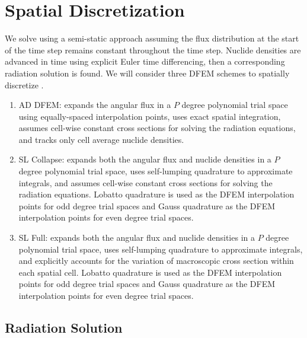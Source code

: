 \section{Spatial Discretization}

We solve  using a semi-static approach \cite{bell_glasstone} assuming the flux distribution at the start of the time step remains constant throughout the time step.
Nuclide densities are advanced in time using explicit Euler time differencing, then a corresponding radiation solution is found.  
We will consider three DFEM schemes to spatially discretize .
\begin{enumerate}
\item AD DFEM: expands the angular flux in a $P$ degree polynomial trial space using equally-spaced interpolation points, uses exact spatial integration, assumes  cell-wise constant cross sections for solving the radiation equations, and tracks only cell average nuclide densities.
\item SL Collapse: expands both the angular flux and nuclide densities in a $P$ degree polynomial trial space, uses self-lumping quadrature to approximate integrals, and assumes cell-wise constant cross sections for solving the radiation equations.
Lobatto quadrature is used as the DFEM interpolation points for odd degree trial spaces and Gauss quadrature as the DFEM interpolation points for even degree trial spaces.
\item SL Full: expands both the angular flux and nuclide densities in a $P$ degree polynomial trial space, uses self-lumping quadrature to approximate integrals, and explicitly accounts for the variation of macroscopic cross section within each spatial cell.
Lobatto quadrature is used as the DFEM interpolation points for odd degree trial spaces and Gauss quadrature as the DFEM interpolation points for even degree trial spaces.
\end{enumerate}

\subsection{Radiation Solution}

